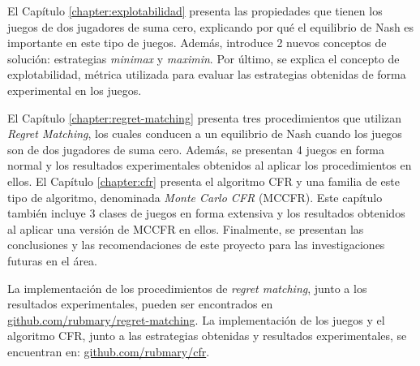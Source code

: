 El Capítulo \ref{chapter:explotabilidad} presenta las propiedades que tienen los juegos de dos jugadores de suma cero, explicando por qué el equilibrio de Nash es importante en este tipo de juegos. Además, introduce 2 nuevos conceptos de solución: estrategias \textit{minimax} y \textit{maximin}. Por último, se explica el concepto de explotabilidad, métrica utilizada para evaluar las estrategias obtenidas de forma experimental en los juegos.

El Capítulo \ref{chapter:regret-matching} presenta tres procedimientos que utilizan \textit{Regret Matching}, los cuales conducen a un equilibrio de Nash cuando los juegos son de dos jugadores de suma cero. Además, se presentan 4 juegos en forma normal y los resultados experimentales obtenidos al aplicar los procedimientos en ellos. El Capítulo \ref{chapter:cfr} presenta el algoritmo CFR y una familia de este tipo de algoritmo, denominada \textit{Monte Carlo CFR} (MCCFR). Este capítulo también incluye 3 clases de juegos en forma extensiva y los resultados obtenidos al aplicar una versión de MCCFR en ellos. Finalmente, se presentan las conclusiones y las recomendaciones de este proyecto para las investigaciones futuras en el área.

La implementación de los procedimientos de \textit{regret matching}, junto a los resultados experimentales, pueden ser encontrados en \url{github.com/rubmary/regret-matching}. La implementación de los juegos y el algoritmo CFR, junto a las estrategias obtenidas y resultados experimentales, se encuentran en: \url{github.com/rubmary/cfr}.